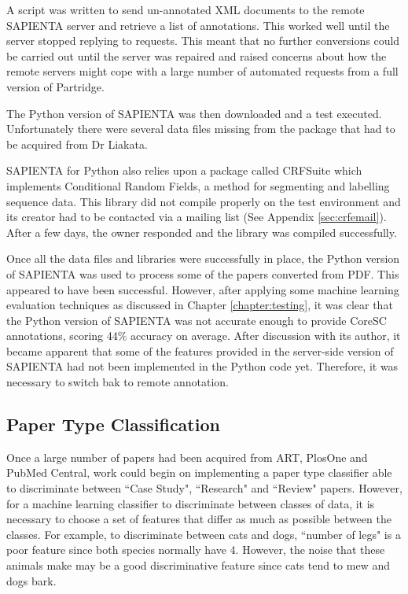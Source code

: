 A script was written to send un-annotated XML documents to the remote SAPIENTA
server and retrieve a list of annotations. This worked well until the server
stopped replying to requests. This meant that no further conversions could be
carried out until the server was repaired and raised concerns about how the
remote servers might cope with a large number of automated requests from a
full version of Partridge.

The Python version of SAPIENTA was then downloaded and a test executed.
Unfortunately there were several data files missing from the package that had
to be acquired from Dr Liakata. 

SAPIENTA for Python also relies upon a package called CRFSuite which implements
Conditional Random Fields, a method for segmenting and labelling sequence
data\cite{CRFsuite}. This library did not compile properly on the test
environment and its creator had to be contacted via a mailing list (See
Appendix \ref{sec:crfemail}). After a few days, the owner responded and the
library was compiled successfully.  

Once all the data files and libraries were successfully in place, the Python
version of SAPIENTA was used to process some of the papers converted from PDF.
This appeared to have been successful. However, after applying some machine
learning evaluation techniques as discussed in Chapter \ref{chapter:testing},
it was clear that the Python version of SAPIENTA was not accurate enough to
provide CoreSC annotations, scoring 44\% accuracy on average. After discussion
with its author, it became apparent that some of the features provided in the
server-side version of SAPIENTA had not been implemented in the Python code
yet. Therefore, it was necessary to switch bak to remote annotation.

\subsection{Paper Type Classification}

Once a large number of papers had been acquired from ART, PlosOne and PubMed
Central, work could begin on implementing a paper type classifier able to
discriminate between ``Case Study", ``Research" and ``Review" papers. However,
for a machine learning classifier to discriminate between classes of data, it
is necessary to choose a set of features that differ as much as possible
between the classes. For example, to discriminate between cats and dogs,
``number of legs" is a poor feature since both species normally have 4.
However, the noise that these animals make may be a good discriminative feature
since cats tend to mew and dogs bark. 

